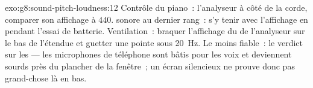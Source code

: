 \begin{solution}{exo:g8:sound-pitch-loudness:12}
Contrôle du piano~: l'analyseur à côté de la corde, comparer son
affichage à $440$.  sonore au dernier rang~: s'y tenir avec
l'affichage en  pendant l'essai de batterie. Ventilation~:
braquer l'affichage du  de l'analyseur sur le bas de l'étendue
et guetter une pointe sous \qty{20}{Hz}. Le moins fiable~: le verdict
sur les  --- les microphones de téléphone sont bâtis pour les
voix et deviennent sourds près du plancher de la fenêtre~; un écran
silencieux ne prouve donc pas grand-chose là en bas.
\end{solution}

